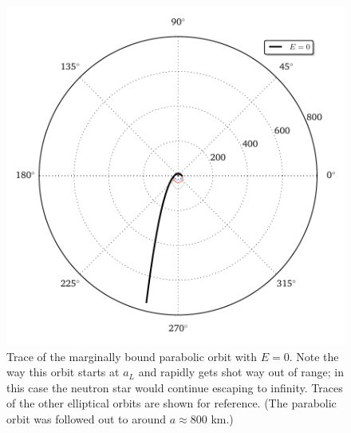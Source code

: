 \documentclass[11pt]{article}
\begin{document}
\begin{figure}[!h]
\centering
\includegraphics[scale=1]{stable_orbit/orbit_diagram_unbound.pdf}
\caption{\label{fig:trace_unbound} Trace of the marginally bound parabolic orbit with $E=0$. Note the way this orbit starts at $a_L$ and rapidly gets shot way out of range; in this case the neutron star would continue escaping to infinity. Traces of the other elliptical orbits are shown for reference. (The parabolic orbit was followed out to around $a\approx 800$ km.)}
\end{figure}
\end{document}
